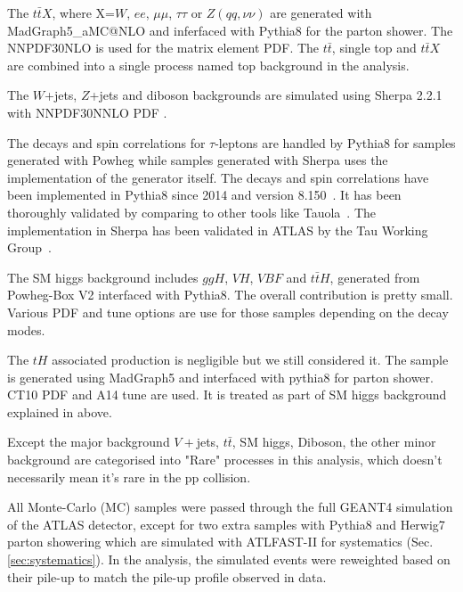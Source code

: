 The $t\bar{t}X$, where X=$W$, $ee$, $\mu\mu$, $\tau\tau$ or $Z(qq,\nu\nu)$ are generated with MadGraph5\_aMC@NLO and inferfaced with Pythia8 for the parton shower. The NNPDF30NLO \cite{NNPDF30NLO} is used for the matrix element PDF. The $t\bar{t}$, single top and $t\bar{t}X$ are combined into a single process named top background in the analysis.

The $W$+jets, $Z$+jets and diboson backgrounds are simulated using Sherpa 2.2.1 \cite{Sherpa} with NNPDF30NNLO PDF \cite{NNPDF30NLO}.

The decays and spin correlations for $\tau$-leptons are handled by Pythia8 for samples generated with Powheg while samples generated with Sherpa uses the implementation of the generator itself. The decays and spin correlations have been implemented in Pythia8 since 2014 and version 8.150~\cite{Pythia8TauDecay}. It has been thoroughly validated by comparing to other tools like Tauola~\cite{TauolaPhotosII}. The implementation in Sherpa has been validated in ATLAS by the Tau Working Group~\cite{ATLASTauGenValidation}.

The SM higgs background includes $ggH$, $VH$, $VBF$ and $t\bar{t}H$, generated from Powheg-Box \cite{Powheg} V2 interfaced with Pythia8. The overall contribution is pretty small. Various PDF and tune options are use for those samples depending on the decay modes.

The $tH$ associated production is negligible but we still considered it. The sample is generated using MadGraph5 and interfaced with pythia8 for parton shower. CT10 PDF and A14 tune are used. It is treated as part of SM higgs background explained in above.

Except the major background $V+$jets, $t\bar{t}$, SM higgs, Diboson, the other minor background are categorised into "Rare" processes in this analysis, which doesn't necessarily mean it's rare in the pp collision.

All Monte-Carlo (MC) samples were passed through the full GEANT4 \cite{GEANT4} simulation of the ATLAS detector, except for two extra \ttbar samples with Pythia8 and Herwig7 \cite{Herwig} parton showering which are simulated with ATLFAST-II \cite{AFII} for systematics (Sec. \ref{sec:systematics}). In the analysis, the simulated events were reweighted based on their pile-up to match the pile-up profile observed in data.

